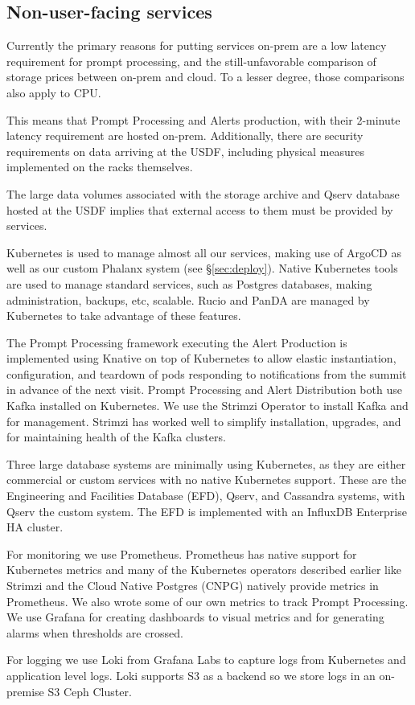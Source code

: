 \subsection{Non-user-facing services}

Currently the primary reasons for putting services on-prem are a low
latency requirement for prompt processing, and the still-unfavorable
comparison of storage prices between on-prem and cloud. To a lesser
degree, those comparisons also apply to CPU.

This means that Prompt Processing and Alerts production, with their
2-minute latency requirement are hosted on-prem. Additionally, there
are security requirements on data arriving at the USDF, including
physical measures implemented on the racks themselves.\cite{DMTN-199}

The large data volumes associated with the storage archive and Qserv
database hosted at the USDF implies that external access to them must be
provided by services.

Kubernetes is used to manage almost all our services, making use of
ArgoCD as well as our custom Phalanx system (see \S \ref{sec:deploy}).
Native Kubernetes tools
are used to manage standard services, such as Postgres databases,
making administration, backups, etc, scalable. Rucio and PanDA are
managed by Kubernetes to take advantage of these features.

The Prompt Processing framework executing the Alert Production is implemented
using Knative on top of
Kubernetes to allow elastic instantiation, configuration, and teardown of
pods responding to notifications from the summit in advance of the
next visit.
Prompt Processing and Alert Distribution both use Kafka installed on Kubernetes.
We use the Strimzi Operator to install Kafka and for management.  Strimzi
has worked well to simplify installation, upgrades, and for maintaining
health of the Kafka clusters.

Three large database systems are minimally using Kubernetes, as they
are either commercial or custom services with no native Kubernetes
support. These are the Engineering and Facilities Database (EFD),\cite{2024SPIE13101.59Ftmp}
Qserv, and Cassandra systems, with Qserv the custom system.
The EFD is implemented with an InfluxDB Enterprise HA cluster.

For monitoring we use Prometheus.  Prometheus has native support for
Kubernetes metrics and many of the Kubernetes operators described earlier
like Strimzi and the Cloud Native Postgres (CNPG) natively provide metrics in Prometheus. We also
wrote some of our own metrics to track Prompt Processing.
We use Grafana for creating dashboards to visual metrics and for generating alarms when thresholds are crossed.

For logging we use Loki from Grafana Labs to capture logs from Kubernetes
and application level logs.  Loki supports S3 as a backend so we store logs
in an on-premise S3 Ceph Cluster.
